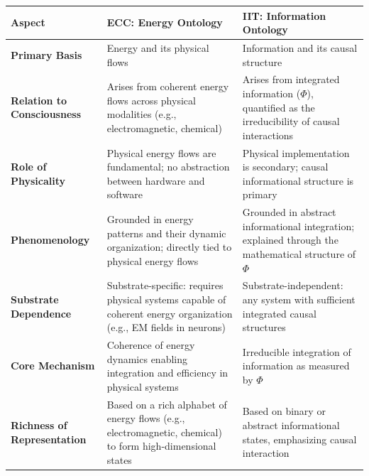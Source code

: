 \begin{refsection}
  \begin{table}[h!]
    \centering
    \setlength{\extrarowheight}{2pt} %
    \begin{tabularx}{\textwidth}{@{}p{3cm}Xp{4cm}@{}}
      \toprule
      \textbf{Aspect}                     & \textbf{ECC: Energy Ontology}                                                                                      & \textbf{IIT: Information Ontology}                                                                     \\ \midrule
      \textbf{Primary Basis}              & Energy and its physical flows                                                                                      & Information and its causal structure                                                                   \\
      \textbf{Relation to Consciousness}  & Arises from coherent energy flows across physical modalities (e.g., electromagnetic, chemical)                     & Arises from integrated information ($\Phi$), quantified as the irreducibility of causal interactions   \\
      \textbf{Role of Physicality}        & Physical energy flows are fundamental; no abstraction between hardware and software                                & Physical implementation is secondary; causal informational structure is primary                        \\
      \textbf{Phenomenology}              & Grounded in energy patterns and their dynamic organization; directly tied to physical energy flows                 & Grounded in abstract informational integration; explained through the mathematical structure of $\Phi$ \\
      \textbf{Substrate Dependence}       & Substrate-specific: requires physical systems capable of coherent energy organization (e.g., EM fields in neurons) & Substrate-independent: any system with sufficient integrated causal structures                         \\
      \textbf{Core Mechanism}             & Coherence of energy dynamics enabling integration and efficiency in physical systems                               & Irreducible integration of information as measured by $\Phi$                                           \\
      \textbf{Richness of Representation} & Based on a rich alphabet of energy flows (e.g., electromagnetic, chemical) to form high-dimensional states         & Based on binary or abstract informational states, emphasizing causal interaction                       \\

\end{tabularx}
\end{table}
\end{refsection}
